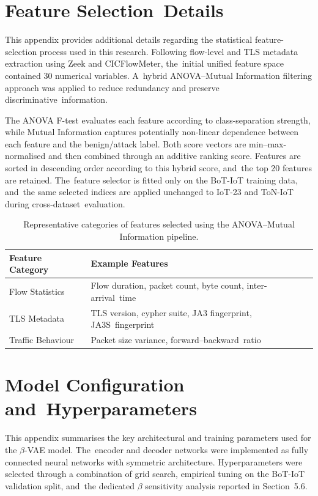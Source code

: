 \documentclass[futureinternet,article,accept,moreauthors]{Definitions/mdpi}
\begin{document}
\appendixstart
\appendix

\section{Feature Selection~Details}

This appendix provides additional details regarding the statistical feature-selection process used in this research. Following flow-level and TLS metadata extraction using Zeek and CICFlowMeter, the~initial unified feature space contained 30 numerical variables. A~hybrid ANOVA--Mutual Information filtering approach was applied to reduce redundancy and preserve discriminative~information.

The ANOVA F-test evaluates each feature according to class-separation strength, while Mutual Information captures potentially non-linear dependence between each feature and the benign/attack label. Both score vectors are min--max-normalised and then combined through an additive ranking score. Features are sorted in descending order according to this hybrid score, and~the top 20 features are retained. The~feature selector is fitted only on the BoT-IoT training data, and~the same selected indices are applied unchanged to IoT-23 and ToN-IoT during cross-dataset~evaluation.

\begin{table}[H]
\caption{Representative categories of features selected using the ANOVA--Mutual Information pipeline.\label{tabA1}}
\begin{tabularx}{\textwidth}{ll}
\toprule
\textbf{Feature Category} & \textbf{Example Features} \\
\midrule
Flow Statistics & Flow duration, packet count, byte count, inter-arrival~time \\
TLS Metadata & TLS version, cypher suite, JA3 fingerprint, JA3S~fingerprint \\
Traffic Behaviour & Packet size variance, forward--backward~ratio \\
\bottomrule
\end{tabularx}
\end{table}
\unskip

\section{Model Configuration and~Hyperparameters} \label{AppB}

This appendix summarises the key architectural and training parameters used for the $\beta$-VAE model. The~encoder and decoder networks were implemented as fully connected neural networks with symmetric architecture. Hyperparameters were selected through a combination of grid search, empirical tuning on the BoT-IoT validation split, and~the dedicated $\beta$ sensitivity analysis reported in Section~5.6.
\end{document}
